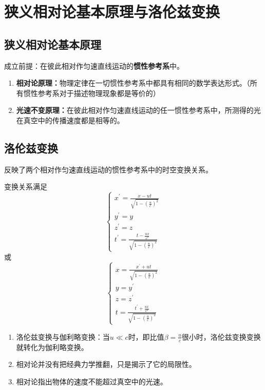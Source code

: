 \section{狭义相对论基本原理与洛伦兹变换}
\subsection{狭义相对论基本原理}
成立前提：在彼此相对作匀速直线运动的\textbf{惯性参考系}中。

\begin{enumerate}
	\item \textbf{相对论原理：}物理定律在一切惯性参考系中都具有相同的数学表达形式。（所有惯性参考系对于描述物理现象都是等价的）
	\item \textbf{光速不变原理：}在彼此相对作匀速直线运动的任一惯性参考系中，所测得的光在真空中的传播速度都是相等的。
\end{enumerate}

\subsection{洛伦兹变换}
反映了两个相对作匀速直线运动的惯性参考系中的时空变换关系。

变换关系满足
$$\begin{cases}
	x^{'}=\frac{x-ut}{\sqrt{1-(\frac{u}{c})^2}}\\
	y^{'}=y\\
	z^{'}=z\\
	t^{'}=\frac{t-\frac{ux}{c^2}}{\sqrt{1-(\frac{u}{c})^2}}
\end{cases}$$
或
$$\begin{cases}
	x=\frac{x^{'}+ut}{\sqrt{1-(\frac{u}{c})^2}}\\
	y=y^{'}\\
	z=z^{'}\\
	t=\frac{t^{'}+\frac{ux}{c^2}}{\sqrt{1-(\frac{u}{c})^2}}
\end{cases}$$
\begin{enumerate}
	\item 洛伦兹变换与伽利略变换：当$u\ll c$时，即比值$\beta=\frac{u}{c}$很小时，洛伦兹变换变换就转化为伽利略变换。
	\item 相对论并没有把经典力学推翻，只是揭示了它的局限性。
	\item 相对论指出物体的速度不能超过真空中的光速。
\end{enumerate}
